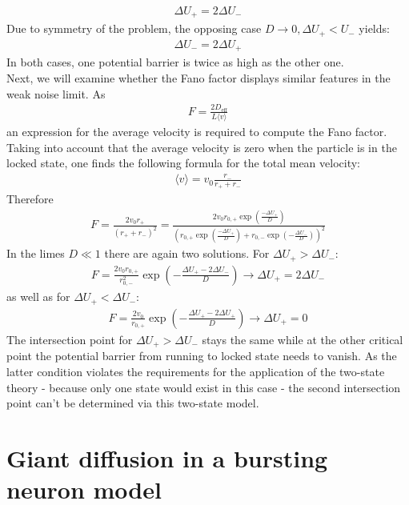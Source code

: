 \documentclass[12pt,a4paper]{article}
\begin{document}
\begin{align*}
\Delta U_+=2\Delta U_-
\end{align*}
Due to symmetry of the problem, the opposing case $D\rightarrow 0,\Delta U_+<U_-$ yields:
\begin{align*}
\Delta U_-=2\Delta U_+
\end{align*}
In both cases, one potential barrier is twice as high as the other one.\\
Next, we will examine whether the Fano factor displays similar features in the weak noise limit. As 
\begin{align*}
F=\frac{2D_{\text{eff}}}{L\langle v\rangle}
\end{align*}
an expression for the average velocity is required to compute the Fano factor. Taking into account that the average velocity is zero when the particle is in the locked state, one finds the following formula for the total mean velocity:
\begin{align*}
\langle v\rangle=v_0\frac{r_-}{r_++r_-}
\end{align*}
Therefore
\begin{align*}
F=\frac{2v_0r_+}{(r_++r_-)^2}=\frac{2v_0r_{0,+}\exp\left(\frac{-\Delta U_+}{D}\right)}{\left(r_{0,+}\exp\left(\frac{-\Delta U_+}{D}\right)+r_{0,-}\exp\left(-\frac{\Delta U_-}{D}\right)\right)^2}
\end{align*}
In the limes $D\ll1$ there are again two solutions. For $\Delta U_+ > \Delta U_-$:
\begin{align*}
F=\frac{2v_0r_{0,+}}{r_{0,-}^2}\exp\left(-\frac{\Delta U_+-2\Delta U_-}{D}\right) \rightarrow \Delta U_+=2\Delta U_-
\end{align*}
as well as for $\Delta U_+ < \Delta U_-$:
\begin{align*}
F=\frac{2v_0}{r_{0,+}}\exp\left(-\frac{\Delta U_+-2\Delta U_+}{D}\right) \rightarrow \Delta U_+=0
\end{align*}
The intersection point for $\Delta U_+ > \Delta U_-$ stays the same while at the other critical point the potential barrier from running to locked state needs to vanish. As the latter condition violates the requirements for the application of the two-state theory - because only one state would exist in this case - the second intersection point can't be determined via this two-state model.
\section{Giant diffusion in a bursting neuron model}
\end{document}
